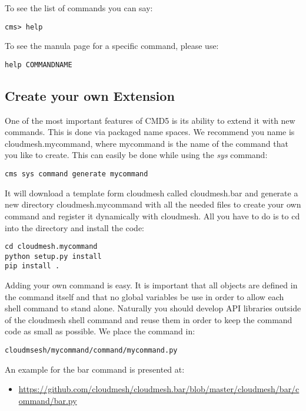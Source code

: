 To see the list of commands you can say:

\begin{verbatim}
cms> help
\end{verbatim}

To see the manula page for a specific command, please use:

\begin{verbatim}
help COMMANDNAME
\end{verbatim}

\subsection{Create your own Extension}\label{create-your-own-extension}

One of the most important features of CMD5 is its ability to extend it
with new commands. This is done via packaged name spaces. We recommend
you name is cloudmesh.mycommand, where mycommand is the name of the
command that you like to create. This can easily be done while using the
\emph{sys} command:

\begin{verbatim}
cms sys command generate mycommand
\end{verbatim}

It will download a template form cloudmesh called cloudmesh.bar and
generate a new directory cloudmesh.mycommand with all the needed files
to create your own command and register it dynamically with cloudmesh.
All you have to do is to cd into the directory and install the code:

\begin{verbatim}
cd cloudmesh.mycommand
python setup.py install
pip install .
\end{verbatim}

Adding your own command is easy. It is important that all objects are
defined in the command itself and that no global variables be use in
order to allow each shell command to stand alone. Naturally you should
develop API libraries outside of the cloudmesh shell command and reuse
them in order to keep the command code as small as possible. We place
the command in:

\begin{verbatim}
cloudmsesh/mycommand/command/mycommand.py
\end{verbatim}

An example for the bar command is presented at:

\begin{itemize}

\item
  \url{https://github.com/cloudmesh/cloudmesh.bar/blob/master/cloudmesh/bar/command/bar.py}
\end{itemize}

